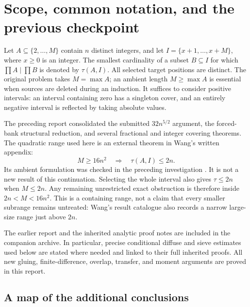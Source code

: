 \documentclass[11pt,a4paper]{article}
\theoremstyle{remark}
\begin{document}
\section{Scope, common notation, and the previous checkpoint}
\label{ct:scope}

Let \(A\subseteq\{2,\ldots,M\}\) contain \(n\) distinct integers,
and let \(I=\{x+1,\ldots,x+M\}\), where \(x\ge0\) is an integer.
The smallest cardinality of a subset \(B\subseteq I\) for which
\(\prod A\mid\prod B\) is denoted by \(\tau(A,I)\).
All selected target positions are distinct. The original problem
takes \(M=\max A\); an ambient length \(M\ge\max A\) is essential
when sources are deleted during an induction.
It suffices to consider positive intervals: an interval containing
zero has a singleton cover, and an entirely negative interval is
reflected by taking absolute values.

The preceding report \cite{Synthesis} consolidated the submitted
\(32n^{5/2}\) argument, the forced-bank structural reduction, and
several fractional and integer covering theorems. The quadratic
range used here is an external theorem in Wang's written appendix:
\begin{equation}
 M\ge16n^2\quad\Longrightarrow\quad\tau(A,I)\le2n.
 \label{ct:quadratic}
\end{equation}
Its ambient formulation was checked in the preceding investigation
\cite[Appendix A]{Wang}. It is not a new result of this continuation.
Selecting the whole interval also gives \(\tau\le2n\) when
\(M\le2n\). Any remaining unrestricted exact obstruction is therefore
inside \(2n<M<16n^2\). This is a containing range, not a claim that
every smaller subrange remains untreated: Wang's result catalogue
also records a narrow large-size range just above \(2n\).

The earlier report and the inherited analytic proof notes are
included in the companion archive. In particular, precise
conditional diffuse and sieve estimates used below are stated
where needed and linked to their full inherited proofs. All new
gluing, finite-difference, overlap, transfer, and moment arguments
are proved in this report.

\subsection{A map of the additional conclusions}
\end{document}
